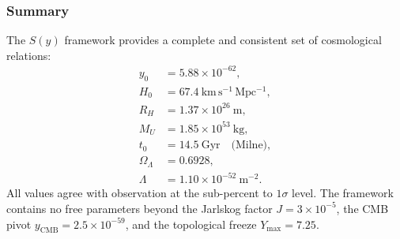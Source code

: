 \documentclass[a4paper,7pt,oneside,openany]{book}
\begin{document}
\subsubsection{Summary}

The $S(y)$ framework provides a complete and consistent set of cosmological relations:
\begin{equation}
\boxed{
\begin{aligned}
y_0 &= 5.88 \times 10^{-62}, \\
H_0 &= 67.4\ \mathrm{km\,s^{-1}\,Mpc^{-1}}, \\
R_H &= 1.37 \times 10^{26}\ \mathrm{m}, \\
M_U &= 1.85 \times 10^{53}\ \mathrm{kg}, \\
t_0 &= 14.5\ \mathrm{Gyr} \quad \text{(Milne)}, \\
\Omega_\Lambda &= 0.6928, \\
\Lambda &= 1.10 \times 10^{-52}\ \mathrm{m^{-2}}.
\end{aligned}}
\label{eq:summary}
\end{equation}
All values agree with observation at the sub-percent to $1\sigma$ level. The framework contains no free parameters beyond the Jarlskog factor $J = 3 \times 10^{-5}$, the CMB pivot $y_{\mathrm{CMB}} = 2.5 \times 10^{-59}$, and the topological freeze $Y_{\max} = 7.25$.
\end{document}
